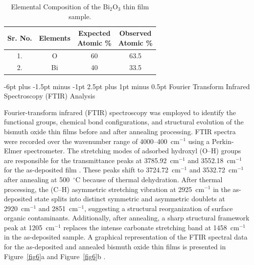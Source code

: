 \documentclass[10pt]{NSP1}
\makeatletter
\renewcommand\subsection{\@startsection{subsection}{2}{\z@}%
  {-6pt plus -1.5pt minus -1pt}%
  {2.5pt plus 1pt minus 0.5pt}%
  {\normalsize\bfseries\itshape}}
\makeatother
\begin{document}
\begin{table}[H]
\centering
\caption{Elemental Composition of the Bi$_2$O$_3$ thin film sample.}
\label{tab2}
\setlength{\tabcolsep}{4pt}
\small
\begin{tabular}{cccc}
\toprule
\textbf{Sr. No.} & \textbf{Elements} & \makecell{\textbf{Expected}\\\textbf{Atomic \%}} & \makecell{\textbf{Observed}\\\textbf{Atomic \%}} \\
\midrule
1. & O  & 60 & 63.5 \\
2. & Bi & 40 & 33.5 \\
\bottomrule
\end{tabular}
\end{table}

\subsection{Fourier Transform Infrared Spectroscopy (FTIR) Analysis}

Fourier-transform infrared (FTIR) spectroscopy was employed to identify the functional groups, chemical bond configurations, and structural evolution of the bismuth oxide thin films before and after annealing processing. FTIR spectra were recorded over the wavenumber range of 4000--400~cm$^{-1}$ using a Perkin-Elmer spectrometer. The stretching modes of adsorbed hydroxyl (O--H) groups are responsible for the transmittance peaks at 3785.92~cm$^{-1}$ and 3552.18~cm$^{-1}$ for the as-deposited film \cite{R25}. These peaks shift to 3724.72~cm$^{-1}$ and 3532.72~cm$^{-1}$ after annealing at 500~$^\circ$C because of thermal dehydration. After thermal processing, the (C--H) asymmetric stretching vibration at 2925~cm$^{-1}$ in the as-deposited state splits into distinct symmetric and asymmetric doublets at 2920~cm$^{-1}$ and 2851~cm$^{-1}$, suggesting a structural reorganization of surface organic contaminants. Additionally, after annealing, a sharp structural framework peak at 1205~cm$^{-1}$ replaces the intense carbonate stretching band at 1458~cm$^{-1}$ in the as-deposited sample. A graphical representation of the FTIR spectral data for the as-deposited and annealed bismuth oxide thin films is presented in Figure~\ref{fig6}a and Figure~\ref{fig6}b \cite{R26,R27}.
\end{document}
